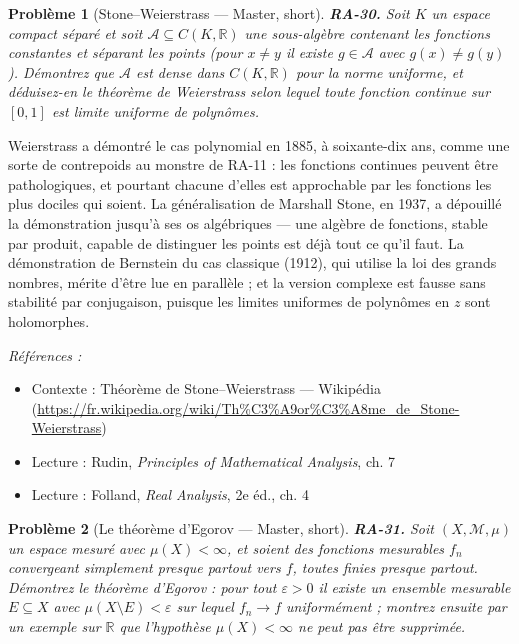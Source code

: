 \documentclass[11pt]{article}
\newtheorem{problem}{Problème}
\newenvironment{refs}{\par\small\noindent\emph{Références :}\begin{itemize}\setlength\itemsep{0pt}}{\end{itemize}\normalsize}
\begin{document}
\bigskip

\begin{problem}[{Stone--Weierstrass --- Master, short}]
\textbf{RA-30.} Soit $ K $ un espace compact séparé et soit
$ \mathcal{A} \subseteq C(K, \mathbb{R}) $ une sous-algèbre contenant les fonctions constantes et
séparant les points (pour $ x \ne y $ il existe $ g \in \mathcal{A} $ avec
$ g(x) \ne g(y) $). Démontrez que $ \mathcal{A} $ est dense dans $ C(K, \mathbb{R}) $ pour la
norme uniforme, et déduisez-en le théorème de Weierstrass selon lequel toute fonction continue sur
$ [0,1] $ est limite uniforme de polynômes.
\end{problem}

\noindent Weierstrass a démontré le cas polynomial en 1885, à soixante-dix ans, comme une
sorte de contrepoids au monstre de RA-11 : les fonctions continues peuvent être pathologiques, et
pourtant chacune d'elles est approchable par les fonctions les plus dociles qui soient. La
généralisation de Marshall Stone, en 1937, a dépouillé la démonstration jusqu'à ses os algébriques ---
une algèbre de fonctions, stable par produit, capable de distinguer les points est déjà tout ce
qu'il faut. La démonstration de Bernstein du cas classique (1912), qui utilise la loi des grands
nombres, mérite d'être lue en parallèle ; et la version complexe est fausse sans stabilité par
conjugaison, puisque les limites uniformes de polynômes en $ z $ sont holomorphes.

\begin{refs}
\item Contexte : Théorème de Stone--Weierstrass --- Wikipédia (\url{https://fr.wikipedia.org/wiki/Th%C3%A9or%C3%A8me_de_Stone-Weierstrass})
\item Lecture : Rudin, \textit{Principles of Mathematical Analysis}, ch. 7
\item Lecture : Folland, \textit{Real Analysis}, 2e éd., ch. 4
\end{refs}

\bigskip

\begin{problem}[{Le théorème d'Egorov --- Master, short}]
\textbf{RA-31.} Soit $ (X, \mathcal{M}, \mu) $ un espace mesuré avec
$ \mu(X) < \infty $, et soient des fonctions mesurables $ f_n $ convergeant simplement presque
partout vers $ f $, toutes finies presque partout. Démontrez le théorème d'Egorov : pour tout
$ \varepsilon > 0 $ il existe un ensemble mesurable $ E \subseteq X $ avec
$ \mu(X \setminus E) < \varepsilon $ sur lequel $ f_n \to f $ uniformément ; montrez ensuite
par un exemple sur $ \mathbb{R} $ que l'hypothèse $ \mu(X) < \infty $ ne peut pas être
supprimée.
\end{problem}
\end{document}
